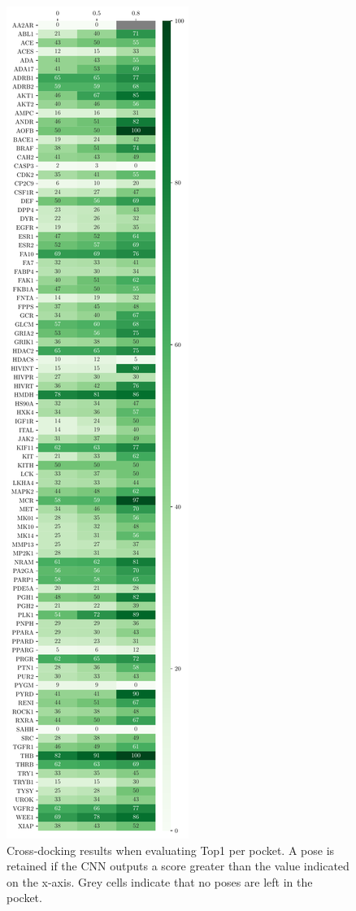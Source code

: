 \documentclass[journal=jcisd8,manuscript=article]{achemso}
\begin{document}
\begin{figure}
    \centering
    \includegraphics[height=0.9\textheight]{figures/crossdocking/thresh_top1_per_pocket.pdf}
    \caption{Cross-docking results when evaluating Top1 per pocket. A pose is retained if the CNN outputs a score greater than the value indicated on the x-axis. Grey cells indicate that no poses are left in the pocket.}
    \label{fig:Thresh_PerPock}
\end{figure}
\end{document}

